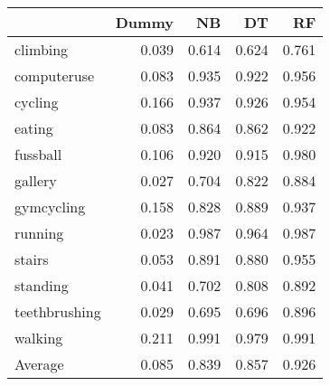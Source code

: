 \begin{tabular}{lrrrr}
\toprule
{} &  Dummy &    NB &    DT &    RF \\
\midrule
climbing      &  0.039 & 0.614 & 0.624 & 0.761 \\
computeruse   &  0.083 & 0.935 & 0.922 & 0.956 \\
cycling       &  0.166 & 0.937 & 0.926 & 0.954 \\
eating        &  0.083 & 0.864 & 0.862 & 0.922 \\
fussball      &  0.106 & 0.920 & 0.915 & 0.980 \\
gallery       &  0.027 & 0.704 & 0.822 & 0.884 \\
gymcycling    &  0.158 & 0.828 & 0.889 & 0.937 \\
running       &  0.023 & 0.987 & 0.964 & 0.987 \\
stairs        &  0.053 & 0.891 & 0.880 & 0.955 \\
standing      &  0.041 & 0.702 & 0.808 & 0.892 \\
teethbrushing &  0.029 & 0.695 & 0.696 & 0.896 \\
walking       &  0.211 & 0.991 & 0.979 & 0.991 \\
Average       &  0.085 & 0.839 & 0.857 & 0.926 \\
\bottomrule
\end{tabular}
